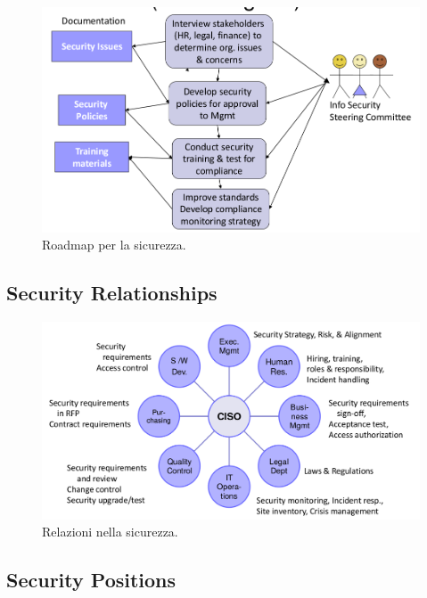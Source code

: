 \begin{figure}[h!]
        \begin{center}
                \includegraphics[scale=0.6]{res/img/roadmap}
        \end{center}
        \caption{Roadmap per la sicurezza.}
\end{figure}

\subsection{Security Relationships}

\begin{figure}[h!]
        \begin{center}
                \includegraphics[scale=0.6]{res/img/relationships}
        \end{center}
        \caption{Relazioni nella sicurezza.}
\end{figure}



\subsection{Security Positions}

